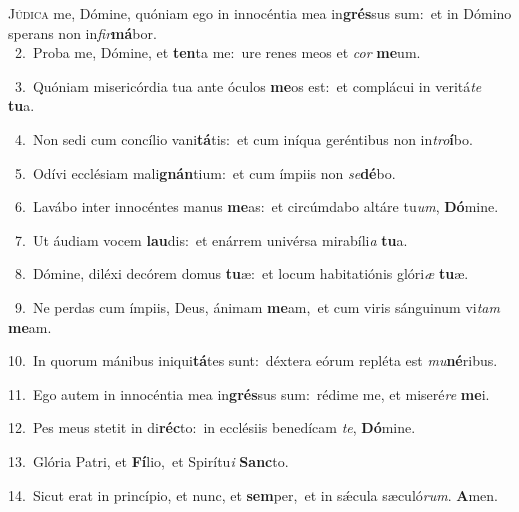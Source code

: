 \lettrine{\initial\textcolor{\initialcolor}{J}}{údica} me, Dómine, quóniam ego in innocéntia mea in\-\textbf{grés}\-sus sum:~\star et in Dómino sperans non in\-\textit{fir}\-\textbf{má}bor.\\
{\numbfont\textcolor{\numbcolor}{~2.}}~Proba me, Dómine, et \textbf{ten}\-ta me:~\star ure renes meos et \textit{cor} \textbf{me}\-um.\par
{\numbfont\textcolor{\numbcolor}{~3.}}~Quóniam misericórdia tua ante óculos \textbf{me}\-os est:~\star et complácui in veritá\textit{te} \textbf{tu}\-a.\par
{\numbfont\textcolor{\numbcolor}{~4.}}~Non sedi cum concílio vani\-\textbf{tá}\-tis:~\star et cum iníqua geréntibus non in\-\textit{tro}\-\textbf{í}bo.\par
{\numbfont\textcolor{\numbcolor}{~5.}}~Odívi ecclésiam mali\-\textbf{gnán}\-tium:~\star et cum ímpiis non \textit{se}\-\textbf{dé}bo.\par
{\numbfont\textcolor{\numbcolor}{~6.}}~Lavábo inter innocéntes manus \textbf{me}\-as:~\star et circúmdabo altáre tu\-\textit{um}\-, \textbf{Dó}\-mine.\par
{\numbfont\textcolor{\numbcolor}{~7.}}~Ut áudiam vocem \textbf{lau}\-dis:~\star et enárrem univérsa mirabíli\textit{a} \textbf{tu}\-a.\par
{\numbfont\textcolor{\numbcolor}{~8.}}~Dómine, diléxi decórem domus \textbf{tu}\-æ:~\star et locum habitatiónis glóri\textit{æ} \textbf{tu}\-æ.\par
{\numbfont\textcolor{\numbcolor}{~9.}}~Ne perdas cum ímpiis, Deus, ánimam \textbf{me}\-am,~\star et cum viris sánguinum vi\textit{tam} \textbf{me}\-am.\par
{\numbfont\textcolor{\numbcolor}{10.}}~In quorum mánibus iniqui\-\textbf{tá}\-tes sunt:~\star déxtera eórum repléta est \textit{mu}\-\textbf{né}ribus.\par
{\numbfont\textcolor{\numbcolor}{11.}}~Ego autem in innocéntia mea in\-\textbf{grés}\-sus sum:~\star rédime me, et miseré\textit{re} \textbf{me}\-i.\par
{\numbfont\textcolor{\numbcolor}{12.}}~Pes meus stetit in di\-\textbf{réc}\-to:~\star in ecclésiis benedícam \textit{te}\-, \textbf{Dó}\-mine.\par
{\numbfont\textcolor{\numbcolor}{13.}}~Glória Patri, et \textbf{Fí}\-lio,~\star et Spirítu\textit{i} \textbf{Sanc}\-to.\par
{\numbfont\textcolor{\numbcolor}{14.}}~Sicut erat in princípio, et nunc, et \textbf{sem}\-per,~\star et in sǽcula sæculó\-\textit{rum}\-. \textbf{A}\-men.\par
